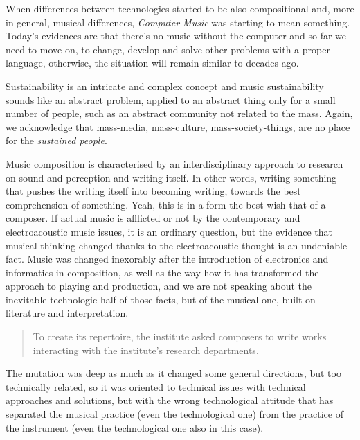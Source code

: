\documentclass[twoside,a4paper]{article}
\begin{document}

When differences between technologies started to be also compositional and, more in general, musical differences, \emph{Computer Music} was starting to mean something. Today's evidences are that there's no music without the computer and so far we need to move on, to change, develop and solve other problems with a proper language, otherwise, the situation will remain similar to decades ago.

Sustainability is an intricate and complex concept and music sustainability sounds like an abstract problem, applied to an abstract thing only for a small number of people, such as an abstract community not related to the mass. Again, we acknowledge that mass-media, mass-culture, mass-society-things, are no place for the \emph{sustained people}.

Music composition is characterised by an interdisciplinary approach to research on sound and perception and writing itself. In other words, writing something that pushes the writing itself into becoming writing, towards the best comprehension of something. Yeah, this is in a form the best wish that of a composer. If actual music is afflicted or not by the contemporary and electroacoustic music issues, it is an ordinary question, but the evidence that musical thinking changed thanks to the electroacoustic thought is an undeniable fact. Music was changed inexorably after the introduction of electronics and informatics in composition, as well as the way how it has transformed the approach to playing and production, and we are not speaking about the inevitable technologic half of those facts, but of the musical one, built on literature and interpretation.

\begin{quote}
To create its repertoire, the institute asked composers to write works interacting with the institute’s research departments\cite{lem16}.
\end{quote}

The mutation was deep as much as it changed some general directions, but too technically related, so it was oriented to technical issues with technical approaches and solutions, but with the wrong technological attitude that has separated the musical practice (even the technological one) from the practice of the instrument (even the technological one also in this case). 
\end{document}

